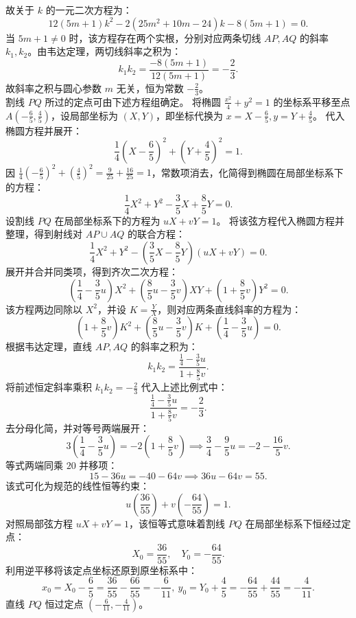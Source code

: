 \begin{solution}
\[\]
故关于 $k$ 的一元二次方程为：
\[
12(5m + 1)k^2 - 2(25m^2 + 10m - 24)k - 8(5m + 1) = 0.
\]
当 $5m + 1 \neq 0$ 时，该方程存在两个实根，分别对应两条切线 $AP, AQ$ 的斜率 $k_1, k_2$。由韦达定理，两切线斜率之积为：
\[
k_1 k_2 = \frac{-8(5m + 1)}{12(5m + 1)} = -\frac{2}{3}.
\]
故斜率之积与圆心参数 $m$ 无关，恒为常数 $-\frac{2}{3}$。\\
割线 $PQ$ 所过的定点可由下述方程组确定。
将椭圆 $\frac{x^2}{4} + y^2 = 1$ 的坐标系平移至点 $A\left(-\frac{6}{5}, \frac{4}{5}\right)$，设局部坐标为 $(X, Y)$，即坐标代换为 $x = X - \frac{6}{5}, y = Y + \frac{4}{5}$。
代入椭圆方程并展开：
\[
\frac{1}{4}\left(X - \frac{6}{5}\right)^2 + \left(Y + \frac{4}{5}\right)^2 = 1.
\]
因 $\frac{1}{4}\left(-\frac{6}{5}\right)^2 + \left(\frac{4}{5}\right)^2 = \frac{9}{25} + \frac{16}{25} = 1$，常数项消去，化简得到椭圆在局部坐标系下的方程：
\[
\frac{1}{4}X^2 + Y^2 - \frac{3}{5}X + \frac{8}{5}Y = 0.
\]
设割线 $PQ$ 在局部坐标系下的方程为 $uX + vY = 1$。
将该弦方程代入椭圆方程并整理，得到射线对 $AP \cup AQ$ 的联合方程：
\[
\frac{1}{4}X^2 + Y^2 - \left(\frac{3}{5}X - \frac{8}{5}Y\right)(uX + vY) = 0.
\]
展开并合并同类项，得到齐次二次方程：
\[
\left(\frac{1}{4} - \frac{3}{5}u\right) X^2 + \left(\frac{8}{5}u - \frac{3}{5}v\right) XY + \left(1 + \frac{8}{5}v\right) Y^2 = 0.
\]
该方程两边同除以 $X^2$，并设 $K = \frac{Y}{X}$，则对应两条直线斜率的方程为：
\[
\left(1 + \frac{8}{5}v\right) K^2 + \left(\frac{8}{5}u - \frac{3}{5}v\right) K + \left(\frac{1}{4} - \frac{3}{5}u\right) = 0.
\]
根据韦达定理，直线 $AP, AQ$ 的斜率之积为：
\[
k_1 k_2 = \frac{\frac{1}{4} - \frac{3}{5}u}{1 + \frac{8}{5}v}.
\]
将前述恒定斜率乘积 $k_1 k_2 = -\frac{2}{3}$ 代入上述比例式中：
\[
\frac{\frac{1}{4} - \frac{3}{5}u}{1 + \frac{8}{5}v} = -\frac{2}{3}.
\]
去分母化简，并对等号两端展开：
\[
3\left(\frac{1}{4} - \frac{3}{5}u\right) = -2\left(1 + \frac{8}{5}v\right) \implies \frac{3}{4} - \frac{9}{5}u = -2 - \frac{16}{5}v.
\]
等式两端同乘 $20$ 并移项：
\[
15 - 36u = -40 - 64v \implies 36u - 64v = 55.
\]
该式可化为规范的线性恒等约束：
\[
u \left(\frac{36}{55}\right) + v \left(-\frac{64}{55}\right) = 1.
\]
对照局部弦方程 $uX + vY = 1$，该恒等式意味着割线 $PQ$ 在局部坐标系下恒经过定点：
\[
X_0 = \frac{36}{55}, \quad Y_0 = -\frac{64}{55}.
\]
利用逆平移将该定点坐标还原到原坐标系中：
\[
x_0 = X_0 - \frac{6}{5} = \frac{36}{55} - \frac{66}{55} = -\frac{6}{11},~y_0 = Y_0 + \frac{4}{5} = -\frac{64}{55} + \frac{44}{55} =-\frac{4}{11}.
\]
直线 $PQ$ 恒过定点 $\left(-\frac{6}{11}, -\frac{4}{11}\right)$。
\end{solution}



